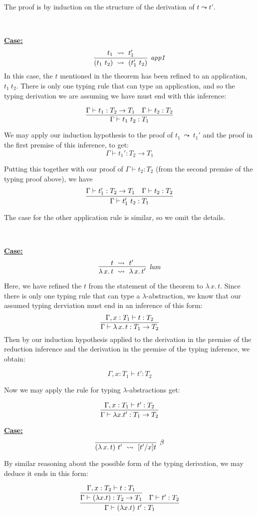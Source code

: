 \documentclass{article}
\providecommand{\betarule}[0]{\infer[\beta]{(\lambda\,x.\, t)\ t'\ \leadsto\ [t'/x]t}
                                {\ }}
\providecommand{\lamrule}[0]{\infer[\textit{lam}]{\lambda\,x.\, t\ \leadsto\ \lambda\,x.\, t'}
                               {t\ \leadsto\ t'}}
\providecommand{\apparule}[0]{\infer[\textit{app1}]{(t_1\ t_2)\ \leadsto\ (t_1'\ t_2)}
                                {t_1\ \leadsto\ t_1'}}
\begin{document}
The proof is
  by induction on the structure of the derivation of $t \leadsto t'$.  

\ 

\noindent \underline{\textbf{Case:}}
\[
\apparule
\]
\noindent In this case, the $t$ mentioned in the theorem has been
refined to an application, $t_1\ t_2$.  There is only one typing rule that
can type an application, and so the typing derivation we are assuming
we have must end with this inference:

\[
\infer{\Gamma \vdash t_1\ t_2 : T_1}
      {\Gamma \vdash t_1 : T_2 \to T_1 & \Gamma \vdash t_2 : T_2}
\]

\noindent We may apply our induction hypothesis to the proof of $t_1\
\leadsto\ t_1'$ and the proof in the first premise of this inference,
to get:
\[ 
\Gamma \vdash t_1' : T_2\to T_1
\]

\noindent Putting this together with our proof of $\Gamma \vdash t_2 : T_2$
(from the second premise of the typing proof above), we have
\[
\infer{\Gamma \vdash t_1'\ t_2: T_1}
{\Gamma \vdash t_1' : T_2\to T_1 & \Gamma \vdash t_2:T_2}
\]

\noindent The case for the other application rule is similar, so we omit the details.

\ 

\noindent \underline{\textbf{Case:}}
\[
\lamrule
\]

\noindent Here, we have refined the $t$ from the statement of the theorem
to $\lambda\,x.\, t$.  Since there is only one typing rule that can type
a $\lambda$-abstraction, we know that our assumed typing derviation must
end in an inference of this form:
\[ 
\infer{\Gamma\vdash \lambda\,x.\,t : T_1 \to T_2}
      {\Gamma,x:T_1\vdash t:T_2}
\]
\noindent Then by our induction hypothesis applied to the derivation in
the premise of the reduction inference and the derivation in the premise
of the typing inference, we obtain:

\[ 
\Gamma, x:T_1 \vdash t' : T_2
\]
       
\noindent Now we may apply the rule for typing $\lambda$-abstractions get:

\[
\infer{\Gamma \vdash \lambda x. t' : T_1 \to T_2}
{\Gamma, x:T_1 \vdash t' : T_2}
\]

\noindent \underline{\textbf{Case:}}
\[ 
\betarule
\]

\noindent By similar reasoning about the possible form of the typing derivation, we may deduce
it ends in this form:

\[ 
\infer{\Gamma \vdash (\lambda x.t)\ t' : T_1}
       {\infer{\Gamma \vdash (\lambda x.t) : T_2\to T_1}
              {\Gamma, x : T_2 \vdash t : T_1} & \Gamma \vdash t' : T_2}
\]
\end{document}
